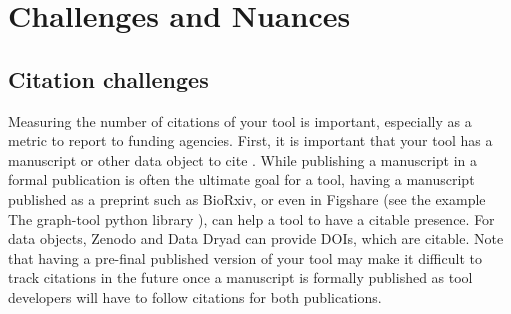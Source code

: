 \documentclass{article}
\begin{document}
\section{Challenges and Nuances}

\subsection{Citation challenges}
Measuring the number of citations of your tool is important, especially as a metric to report to funding agencies. First, it is important that your tool has a manuscript or other data object to cite \cite{chue_hong_software_2019}. While publishing a manuscript in a formal publication is often the ultimate goal for a tool, having a manuscript published as a preprint such as BioRxiv, or even in Figshare (see the example The graph-tool python library \cite{peixoto_graph-tool_2017}), can help a tool to have a citable presence. For data objects, Zenodo and Data Dryad can provide DOIs, which are citable. Note that having a pre-final published version of your tool may make it difficult to track citations in the future once a manuscript is formally published as tool developers will have to follow citations for both publications.
\end{document}
